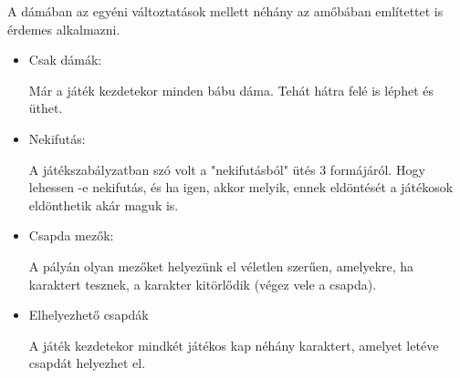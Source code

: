 A dámában az egyéni változtatások mellett néhány az amőbában említettet is érdemes alkalmazni.
\begin{itemize}
	\item Csak dámák:
	
	Már a játék kezdetekor minden bábu dáma. Tehát hátra felé is léphet és üthet.
	\item Nekifutás:
	
	A játékszabályzatban szó volt a "nekifutásból" ütés 3 formájáról. Hogy lehessen -e nekifutás, és ha igen, akkor melyik, ennek eldöntését a játékosok eldönthetik akár maguk is.
	
	\item Csapda mezők:
	
	A pályán olyan mezőket helyezünk el véletlen szerűen, amelyekre, ha karaktert tesznek, a karakter kitörlődik (végez vele a csapda).
	
	\item Elhelyezhető csapdák
	
	A játék kezdetekor mindkét játékos kap néhány karaktert, amelyet letéve csapdát helyezhet el.	
\end{itemize}


